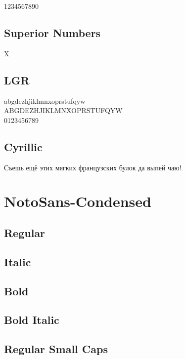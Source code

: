 \documentclass{article}
\begin{document}
1234567890

\subsection*{Superior Numbers}

X


\subsection*{LGR}

{\notoserifcondensedlgr\noindent
abgdezhjiklmnxoprstufqyw\\
ABGDEZHJIKLMNXOPRSTUFQYW\\
0123456789
}

\subsection*{Cyrillic}

{\ifxetex\else\ifluatex\else{}\selectfont\fi\fi
Съешь ещё этих мягких французских булок да
выпей чаю!}

\section*{NotoSans-Condensed}

\sffamily

\subsection*{Regular}
\lipsum[1]

\subsection*{Italic}
\textit{\lipsum[2]}

\subsection*{Bold}

\textbf{\lipsum[3]}



\subsection*{Bold Italic}

\textbf{\textit{\lipsum[4]}}

\subsection*{Regular Small Caps}
\textsc{\lipsum[1]}
\end{document}
